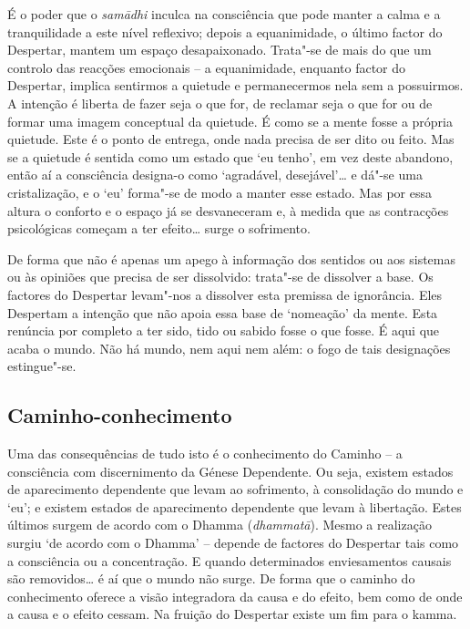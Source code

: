 É o poder que o \emph{samādhi} inculca na consciência que pode manter a calma e
a tranquilidade a este nível reflexivo; depois a equanimidade, o último factor
do Despertar, mantem um espaço desapaixonado. Trata"-se de mais do que um
controlo das reacções emocionais -- a equanimidade, enquanto factor do
Despertar, implica sentirmos a quietude e permanecermos nela sem a possuirmos. A
intenção é liberta de fazer seja o que for, de reclamar seja o que for ou de
formar uma imagem conceptual da quietude. É como se a mente fosse a própria
quietude. Este é o ponto de entrega, onde nada precisa de ser dito ou feito. Mas
se a quietude é sentida como um estado que `eu tenho', em vez deste abandono,
então aí a consciência designa-o como `agradável, desejável'\ldots{} e dá"-se
uma cristalização, e o `eu' forma"-se de modo a manter esse estado. Mas por essa
altura o conforto e o espaço já se desvaneceram e, à medida que as contracções
psicológicas começam a ter efeito\ldots{} surge o sofrimento.

De forma que não é apenas um apego à informação dos sentidos ou aos sistemas ou
às opiniões que precisa de ser dissolvido: trata"-se de dissolver a base. Os
factores do Despertar levam"-nos a dissolver esta premissa de ignorância. Eles
Despertam a intenção que não apoia essa base de `nomeação' da mente. Esta
renúncia por completo a ter sido, tido ou sabido fosse o que fosse. É aqui que
acaba o mundo. Não há mundo, nem aqui nem além: o fogo de tais designações
estingue"-se.

\subsection{Caminho-conhecimento}

Uma das consequências de tudo isto é o conhecimento do Caminho -- a consciência
com discernimento da Génese Dependente. Ou seja, existem estados de aparecimento
dependente que levam ao sofrimento, à consolidação do mundo e `eu'; e existem
estados de aparecimento dependente que levam à libertação. Estes últimos surgem
de acordo com o Dhamma (\emph{dhammatā}).
Mesmo a realização surgiu `de acordo com o Dhamma' -- depende de factores do
Despertar tais como a consciência ou a concentração. E quando determinados
enviesamentos causais são removidos\ldots{} é aí que o mundo não surge. De forma
que o caminho do conhecimento oferece a visão integradora da causa e do efeito,
bem como de onde a causa e o efeito cessam. Na fruição do Despertar existe um
fim para o kamma.

